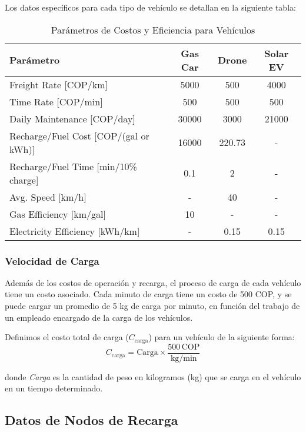 \documentclass[12pt]{article}
\begin{document}
Los datos específicos para cada tipo de vehículo se detallan en la siguiente tabla:

\begin{table}[h!]
\centering
\begin{tabular}{|l|c|c|c|}
\hline
\textbf{Parámetro} & \textbf{Gas Car} & \textbf{Drone} & \textbf{Solar EV} \\
\hline
Freight Rate [COP/km] & 5000 & 500 & 4000 \\
Time Rate [COP/min] & 500 & 500 & 500 \\
Daily Maintenance [COP/day] & 30000 & 3000 & 21000 \\
Recharge/Fuel Cost [COP/(gal or kWh)] & 16000 & 220.73 & - \\
Recharge/Fuel Time [min/10\% charge] & 0.1 & 2 & - \\
Avg. Speed [km/h] & - & 40 & - \\
Gas Efficiency [km/gal] & 10 & - & - \\
Electricity Efficiency [kWh/km] & - & 0.15 & 0.15 \\
\hline
\end{tabular}
\caption{Parámetros de Costos y Eficiencia para Vehículos}
\end{table}

\subsubsection{Velocidad de Carga}

Además de los costos de operación y recarga, el proceso de carga de cada vehículo tiene un costo asociado. Cada minuto de carga tiene un costo de 500 COP, y se puede cargar un promedio de 5 kg de carga por minuto, en función del trabajo de un empleado encargado de la carga de los vehículos.

Definimos el costo total de carga ($C_{\text{carga}}$) para un vehículo de la siguiente forma:
\begin{equation}
C_{\text{carga}} = \text{Carga} \times \frac{500 \, \text{COP}}{\text{kg/min}}
\end{equation}

donde \textit{Carga} es la cantidad de peso en kilogramos (kg) que se carga en el vehículo en un tiempo determinado.

\subsection{Datos de Nodos de Recarga}
\end{document}
